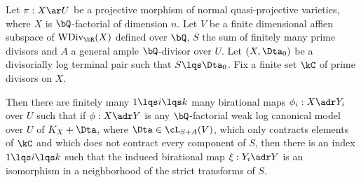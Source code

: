 \documentclass[article, a4paper, twoside]{universal}
\begin{document}
\begin{thm}[$B_{n}$]
	Let $\pi:X\ar U$ be a projective morphism of normal quasi-projective varieties, where $X$ is $\bQ$-factorial of dimension $n$. Let $V$ be a finite dimensional affien subspace of $\mathrm{WDiv}_{\bR}(X)$ defined over $\bQ$, $S$ the sum of finitely many prime divisors and $A$ a general ample $\bQ$-divisor over $U$. Let $(X,\Dta_{0})$ be a divisorially log terminal pair such that $S\lqs\Dta_{0}$. Fix a finite set $\kC$ of prime divisors on $X$.

	Then there are finitely many $1\lqs i\lqs k$ many birational maps $\phi_{i}:X\adr Y_{i}$ over $U$ such that if $\phi:X\adr Y$ is any $\bQ$-factorial weak log canonical model over $U$ of $K_{X}+\Dta$, where $\Dta\in\cL_{S+A}(V)$, which only contracts elements of $\kC$ and which does not contract every component of $S$, then there is an index $1\lqs i\lqs k$ such that the induced birational map $\xi:Y_{i}\adr Y$ is an isomorphism in a neighborhood of the strict transforms of $S$.
\end{thm}

\printref
\end{document}
